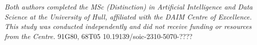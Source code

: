 \documentclass[times]{iapress}
\begin{document}

\maketitle

\noindent\footnotesize\emph{Both authors completed the MSc (Distinction) in Artificial Intelligence and Data Science at the University of Hull, affiliated with the DAIM Centre of Excellence. This study was conducted independently and did not receive funding or resources from the Centre.}\normalsize
\vskip 8pt%
 91G80, 68T05
\vskip 8pt%
 10.19139/soic-2310-5070-????


\end{document}
